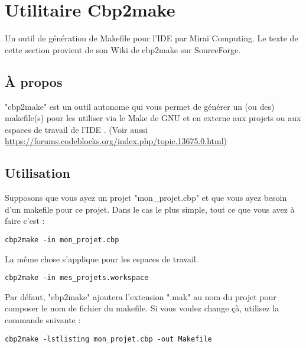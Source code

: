 ﻿\section{Utilitaire Cbp2make}\label{sec:cbp2make}

Un outil de génération de Makefile pour l'IDE \codeblocks par Mirai Computing. Le texte de cette section provient de son Wiki de cbp2make sur SourceForge.

\subsection{À propos}

"cbp2make" est un outil autonome qui vous permet de générer un (ou des) makefile(s) pour les utiliser via le Make de GNU et en externe aux projets ou aux espaces de travail de l'IDE \codeblocks. (Voir aussi \url{https://forums.codeblocks.org/index.php/topic,13675.0.html})

\subsection{Utilisation}

Supposons que vous ayez un projet "mon\_projet.cbp" et que vous ayez besoin d'un makefile pour ce projet. Dans le cas le plus simple, tout ce que vous avez à faire c'est :
\begin{lstlisting}
cbp2make -in mon_projet.cbp
\end{lstlisting}

La même chose s'applique pour les espaces de travail.
\begin{lstlisting}
cbp2make -in mes_projets.workspace
\end{lstlisting}

Par défaut, "cbp2make" ajoutera l'extension ".mak" au nom du projet pour composer le nom de fichier du makefile.
Si vous voulez change çà, utilisez la commande suivante :

\begin{lstlisting}
cbp2make -lstlisting mon_projet.cbp -out Makefile
\end{lstlisting}

